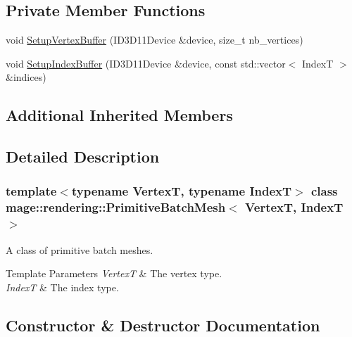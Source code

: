 \subsection*{Private Member Functions}
\begin{DoxyCompactItemize}
\item 
void \mbox{\hyperlink{classmage_1_1rendering_1_1_primitive_batch_mesh_abb8ba052c2f1453f2bd232d787d9a13d}{Setup\+Vertex\+Buffer}} (I\+D3\+D11\+Device \&device, size\+\_\+t nb\+\_\+vertices)
\item 
void \mbox{\hyperlink{classmage_1_1rendering_1_1_primitive_batch_mesh_abe1802b8f201be6ced30199fbce6e852}{Setup\+Index\+Buffer}} (I\+D3\+D11\+Device \&device, const std\+::vector$<$ IndexT $>$ \&indices)
\end{DoxyCompactItemize}
\subsection*{Additional Inherited Members}


\subsection{Detailed Description}
\subsubsection*{template$<$typename VertexT, typename IndexT$>$\newline
class mage\+::rendering\+::\+Primitive\+Batch\+Mesh$<$ Vertex\+T, Index\+T $>$}

A class of primitive batch meshes.


\begin{DoxyTemplParams}{Template Parameters}
{\em VertexT} & The vertex type. \\
\hline
{\em IndexT} & The index type. \\
\hline
\end{DoxyTemplParams}


\subsection{Constructor \& Destructor Documentation}
\mbox{\label{classmage_1_1rendering_1_1_primitive_batch_mesh_aa01b243a0ccb0ed4835c4dcab994d030}} 

